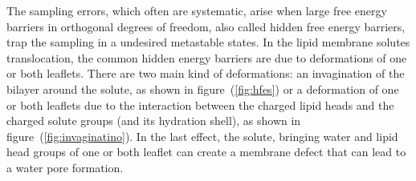 The sampling errors, which often are systematic, arise when large free energy barriers in orthogonal degrees of freedom, also called hidden free energy barriers, trap the sampling in a undesired metastable states. In the lipid membrane solutes translocation, the common hidden energy barriers are due to deformations of one or both leaflets. There are two main kind of deformations: an invagination of the bilayer around the solute, as shown in figure~(\ref{fig:hfes}) or a deformation of one or both leaflets due to the interaction between the charged lipid heads and the charged solute groups (and its hydration shell), as shown in figure~(\ref{fig:invaginatino}). In the last effect, the solute, bringing water and lipid head groups of one or both leaflet can create a membrane defect that can lead to a water pore formation. %
